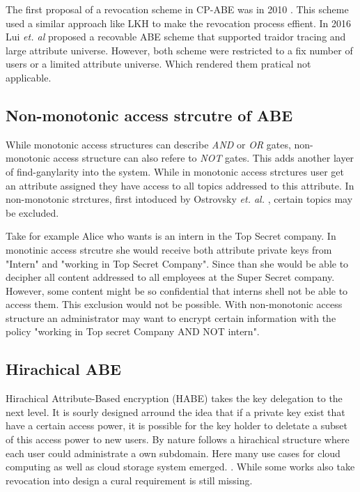The first proposal of a revocation scheme in CP-ABE was in 2010 \cite{liang2010ciphertext}. This scheme used a similar approach like LKH to make the revocation process effient. In 2016 Lui \textit{et. al} \cite{liu2016practical} proposed a recovable ABE scheme that supported traidor tracing and large attribute universe. However, both scheme were restricted to a fix number of users or a limited attribute universe. Which rendered them pratical not applicable.  

\subsection{Non-monotonic access strcutre of ABE}
While monotonic access structures can describe \textit{AND} or \textit{OR} gates, non-monotonic access structure can also refere to \textit{NOT} gates. This adds another layer of find-ganylarity into the system. While in monotonic access strctures user get an attribute assigned they have access to all topics addressed to this attribute. In non-monotonic strctures, first intoduced by Ostrovsky \textit{et. al.} \cite{Ostrovsky:2007:AEN:1315245.1315270}, certain topics may be excluded. 

Take for example Alice who wants is an intern in the Top Secret company. In monotinic access strcutre she would receive both attribute private keys from "Intern" and "working in Top Secret Company". Since than she would be able to decipher all content addressed to all employees at the Super Secret company. However, some content might be so confidential that interns shell not be able to access them. This exclusion would not be possible. With non-monotonic access structure an administrator may want to encrypt certain information with the policy "working in Top secret Company AND NOT intern".  

\subsection{Hirachical ABE}
Hirachical Attribute-Based encryption (HABE) takes the key delegation to the next level. It is sourly designed arround the idea that if a private key exist that have a certain access power, it is possible for the key holder to deletate a subset of this access power to new users. By nature follows a hirachical structure where each user could administrate a own subdomain. Here many use cases for cloud computing as well as cloud storage system emerged. \cite{Wang:2010:HAE:1866307.1866414}. While some works also take revocation into design a cural requirement is still missing. 

